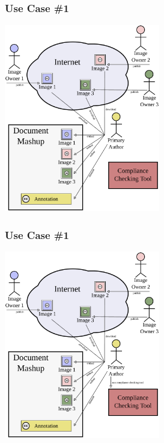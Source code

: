 \documentclass[mathserif,xcolor=dvipsnames,hyperref={bookmarks=true}]{beamer}
\begin{document}
    \begin{frame}[t]
        \frametitle{Use Case \#1}
        \begin{center}
            \includegraphics[width=0.51\textwidth]{../resources/usecases/usecase1/usecase1-step24.pdf}
        \end{center}
    \end{frame}
    \begin{frame}[t]
        \frametitle{Use Case \#1}
        \begin{center}
            \includegraphics[width=0.51\textwidth]{../resources/usecases/usecase1/usecase1-step25.pdf}
        \end{center}
    \end{frame}
\end{document}
